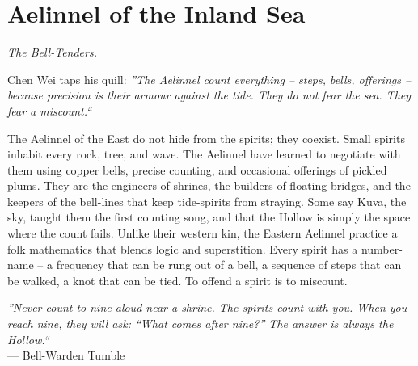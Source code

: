 \documentclass[12pt,oneside]{book}
\begin{document}
\newpage

\newpage

\chapter{Aelinnel of the Inland Sea}
\emph{The Bell-Tenders.}

\noindent
Chen Wei taps his quill: \textit{''The Aelinnel count everything -- steps, bells, offerings -- because precision is their armour against the tide. They do not fear the sea. They fear a miscount.``}

\noindent
The Aelinnel of the East do not hide from the spirits; they coexist. Small spirits inhabit every rock, tree, and wave. The Aelinnel have learned to negotiate with them using copper bells, precise counting, and occasional offerings of pickled plums. They are the engineers of shrines, the builders of floating bridges, and the keepers of the bell-lines that keep tide-spirits from straying. Some say Kuva, the sky, taught them the first counting song, and that the Hollow is simply the space where the count fails. Unlike their western kin, the Eastern Aelinnel practice a folk mathematics that blends logic and superstition. Every spirit has a number-name -- a frequency that can be rung out of a bell, a sequence of steps that can be walked, a knot that can be tied. To offend a spirit is to miscount.

\vspace{0.5em}
\noindent\textit{''Never count to nine aloud near a shrine. The spirits count with you. When you reach nine, they will ask: ``What comes after nine?'' The answer is always the Hollow.``} \\
--- Bell-Warden Tumble
\end{document}
